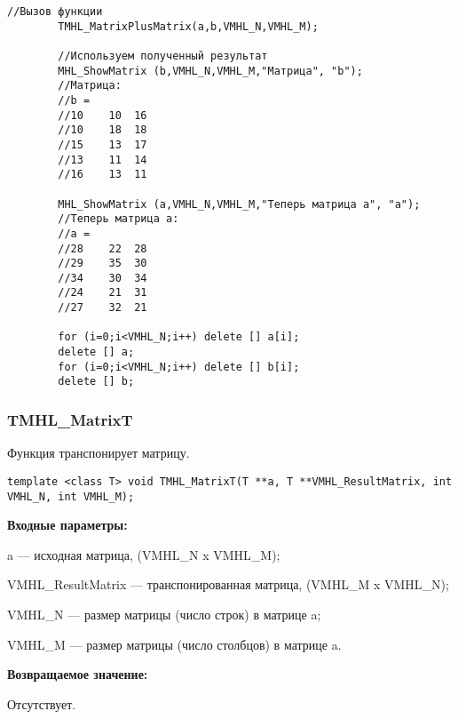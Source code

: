 \documentclass[a4paper,12pt]{article}
\begin{document}
\begin{lstlisting}[label=code_use_TMHL_MatrixPlusMatrix,caption=Пример использования]
        //Вызов функции
        TMHL_MatrixPlusMatrix(a,b,VMHL_N,VMHL_M);

        //Используем полученный результат
        MHL_ShowMatrix (b,VMHL_N,VMHL_M,"Матрица", "b");
        //Матрица:
        //b =
        //10	10	16
        //10	18	18
        //15	13	17
        //13	11	14
        //16	13	11

        MHL_ShowMatrix (a,VMHL_N,VMHL_M,"Теперь матрица a", "a");
        //Теперь матрица a:
        //a =
        //28	22	28
        //29	35	30
        //34	30	34
        //24	21	31
        //27	32	21

        for (i=0;i<VMHL_N;i++) delete [] a[i];
        delete [] a;
        for (i=0;i<VMHL_N;i++) delete [] b[i];
        delete [] b;
\end{lstlisting}

\subsubsection{TMHL\_MatrixT}\label{TMHL_MatrixT}

Функция транспонирует матрицу.


\begin{lstlisting}[label=code_syntax_TMHL_MatrixT,caption=Синтаксис]
template <class T> void TMHL_MatrixT(T **a, T **VMHL_ResultMatrix, int VMHL_N, int VMHL_M);
\end{lstlisting}

\textbf{Входные параметры:}

 a --- исходная матрица, (VMHL\_N x VMHL\_M);
 
 VMHL\_ResultMatrix --- транспонированная матрица, (VMHL\_M x VMHL\_N);
 
 VMHL\_N --- размер матрицы (число строк) в матрице a;
 
 VMHL\_M --- размер матрицы (число столбцов) в матрице a.

\textbf{Возвращаемое значение:}

Отсутствует.
\end{document}
